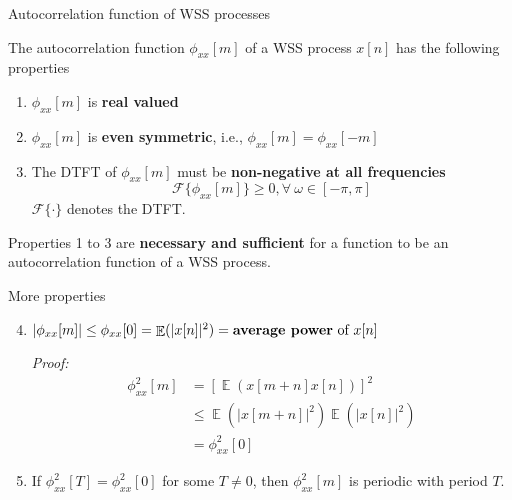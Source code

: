 \documentclass[10pt]{beamer}
\DeclareMathOperator{\E}{\mathbb{E}} %
\begin{document}
%
\begin{frame}{Autocorrelation function of WSS processes}

The autocorrelation function $\phi_{xx}[m]$ of a WSS process $x[n]$ has the following properties

\begin{enumerate}
	\item $\phi_{xx}[m]$ is \textbf{real valued}
	\item $\phi_{xx}[m]$ is \textbf{even symmetric}, i.e., $\phi_{xx}[m] = \phi_{xx}[-m]$
	\item The DTFT of $\phi_{xx}[m]$ must be \textbf{non-negative at all frequencies}
	\begin{equation}
	\mathcal{F}\{\phi_{xx}[m]\} \geq 0, \forall~\omega\in[-\pi, \pi]
	\end{equation}
	$\mathcal{F}\{\cdot\}$ denotes the DTFT.	
\end{enumerate}

	Properties 1 to 3 are \textbf{necessary and sufficient} for a function to be an autocorrelation function of a WSS process.
\end{frame}

%
\begin{frame}
More properties
\begin{enumerate}\setcounter{enumi}{3}
	\item $|\phi_{xx}[m]| \leq \phi_{xx}[0] = \E(|x[n]|^2) = \text{\textbf{average power} of}~x[n]$
	
\textit{Proof:}
\begin{align*}
\phi_{xx}^2[m] &= [\E(x[m+n]x[n])]^2 \\
&\leq \E(|x[m+n]|^2)\E(|x[n]|^2) \tag{by Schwarz inequality} \\
&=\phi_{xx}^2[0] \tag{by stationarity}
\end{align*}
	\item If $\phi_{xx}^2[T] = \phi_{xx}^2[0]$ for some $T\neq 0$, then $\phi_{xx}^2[m]$ is periodic with period $T$.
\end{enumerate}
\end{frame}
\end{document}
